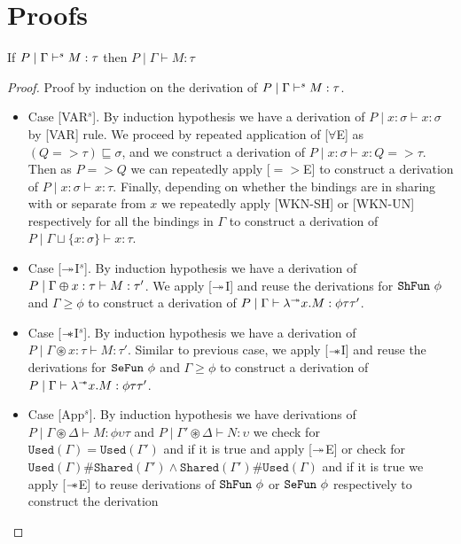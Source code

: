 \chapter{Proofs}\label{chp:proofs}
\begin{theorem}\label{thm:soundness-syntax-directed}
   If $P \mid \Gamma \vdash^s M:\tau$ then $P \mid \Gamma \vdash M:\tau$
\end{theorem}
\begin{proof}\label{prf:soundness-syntax-directed}
  Proof by induction on the derivation of $P \mid \Gamma \vdash^s M:\tau$.
  \begin{itemize}
  \item{Case [VAR$^s$].}
    By induction hypothesis we have a derivation of $P \mid x:\sigma \vdash x:\sigma$ by [VAR] rule.
    We proceed by repeated application of [$\forall$E] as $(Q => \tau) \sqsubseteq \sigma$, and
    we construct a derivation of $P \mid x:\sigma \vdash x: Q => \tau$. Then as $P => Q$ we can
    repeatedly apply [$=>$E] to construct a derivation of $P \mid x:\sigma \vdash x:\tau$.
    Finally, depending on whether the bindings are in sharing with or separate from
    $x$ we repeatedly apply [WKN-SH] or [WKN-UN] respectively for all the bindings in $\Gamma$ to construct
    a derivation of $P \mid \Gamma \sqcup \{x:\sigma\} \vdash x:\tau$.
  \item{Case [$\twoheadrightarrow$I$^s$].}
    By induction hypothesis we have a derivation of $P \mid \Gamma \varoplus x:\tau \vdash M:\tau'$.
    We apply [$\twoheadrightarrow$I] and reuse the derivations for $\texttt{ShFun}\ \phi$ and $\Gamma \geq \phi$  to
    construct a derivation of $P \mid \Gamma \vdash \lambda^{\twoheadrightarrow}x. M: \phi \tau \tau'$.
  \item{Case [$\mathrel{-\mkern-6mu*}$I$^s$].}
    By induction hypothesis we have a derivation of $P \mid \Gamma \circledast x:\tau \vdash M:\tau'$.
    Similar to previous case, we apply [$\mathrel{-\mkern-6mu*}$I] and reuse the derivations for $\texttt{SeFun}\ \phi$ and $\Gamma \geq \phi$  to
    construct a derivation of $P \mid \Gamma \vdash \lambda^{\mathrel{-\mkern-6mu*}}x. M: \phi \tau \tau'$.
  \item{Case [App$^s$].}
    By induction hypothesis we have derivations of $P \mid \Gamma \circledast \Delta \vdash M: \phi \upsilon \tau$ and
    $P \mid \Gamma' \circledast \Delta \vdash N: \upsilon$ we check for $\texttt{Used}(\Gamma) = \texttt{Used}(\Gamma')$ and if it is true
    and apply [$\twoheadrightarrow$E] or check for $\texttt{Used}(\Gamma)\#\texttt{Shared}(\Gamma') \wedge \texttt{Shared}(\Gamma')\#\texttt{Used}(\Gamma)$
    and if it is true we apply [$\mathrel{-\mkern-6mu*}$E] to reuse derivations of $\texttt{ShFun}\ \phi$ or $\texttt{SeFun}\ \phi$ respectively to construct the derivation

\end{itemize}
\end{proof}
